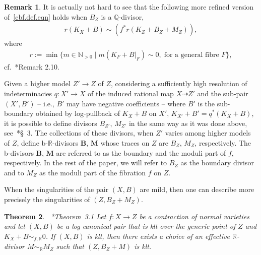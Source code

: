 \documentclass[11pt]{ip-journal}
\newtheorem{theorem}{Theorem}[section]
\theoremstyle{definition}
\newtheorem{remark}[theorem]{Remark}
\newcommand{\bR}{\mathbb{R}}
\begin{document}
\begin{remark}
\label{cbf.lin.eq.rmk}
It is actually not hard to see that the following more refined version of~\eqref{cbf.def.eqn} holds when $B_Z$ is a $\mathbb{Q}$-divisor,
\begin{align*}
r(K_X+B) \sim (f^\ast r(K_Z+B_Z+M_Z)),
\end{align*}
where 
\begin{align*}
r := \min \{m \in \mathbb{N}_{>0} \; | \; m(K_F + B|_F) \sim 0, \; \text{for a general fibre } F\},
\end{align*}
cf.~\cite{MR3180598}*{Remark 2.10}. 
\end{remark}

Given a higher model  
$Z' \to Z$ 
of 
$Z$, 
considering a sufficiently high resolution of indeterminacies
$q \colon X' \to X$
of the induced rational map
$X \dashrightarrow Z'$
and the sub-pair 
$(X', B')$
-- i.e., 
$B'$ 
may have negative coefficients --
 where 
$B'$ 
is the sub-boundary obtained by log-pullback of 
$K_X+B$ 
on 
$X'$, 
$K_{X'}+B' = q^\ast (K_X+B)$,
it is possible to define divisors 
$B_{Z'}$, 
$M_{Z'}$ 
in the same way as it was done above, see~\cite{MR2134273}*{\S~3}.
The collections of these divisors, when 
$Z'$ 
varies among higher models of 
$Z$, 
define 
b-$\mathbb{R}$-divisors 
$\mathbf{B}$, 
$\mathbf{M}$ 
whose traces on 
$Z$ 
are 
$B_Z$, $M_Z$, 
respectively.
The b-divisors 
$\mathbf{B}$, 
$\mathbf{M}$ 
are referred to as the boundary and the moduli part of 
$f$,
respectively.
In the rest of the paper, we will refer to $B_Z$ as the boundary divisor and to $M_Z$ as the moduli part of the fibration $f$ on $Z$.
 
When the singularities of the pair $(X, B)$ are mild, then one can describe more precisely the singularities of $(Z, B_Z+M_Z)$.  
\begin{theorem}
~\cite{MR2944479}*{Theorem~3.1}
\label{bundle}
Let $f \colon X\rightarrow Z$ be a contraction of normal varieties and
let $(X, B)$ be a log canonical pair that is klt over the generic point of $Z$ and $K_{X}+B \sim_{f,\mathbb{R}} 0$.
\newline
If $(X, B)$ is klt, then there exists a choice of an effective $\mathbb{R}$-divisor $M \sim_\bR M_Z$ such that $(Z,B_{Z}+M)$ is klt.
\end{theorem}
\end{document}
